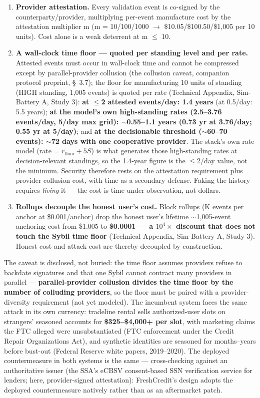 \documentclass[
]{article}
\begin{document}
\begin{enumerate}
\def\labelenumi{\arabic{enumi}.}
\item
  \textbf{Provider attestation.} Every validation event is co-signed by
  the counterparty/provider, multiplying per-event manufacture cost by
  the attestation multiplier m (m = 10/100/1000 \(\rightarrow\)
  \$10.05/\$100.50/\$1,005 per 10 units). Cost alone is a weak deterrent
  at m \(\leq\) 10.
\item
  \textbf{A wall-clock time floor --- quoted per standing level and per
  rate.} Attested events must occur in wall-clock time and cannot be
  compressed except by parallel-provider collusion (the collusion
  caveat, companion protocol preprint, §~3.7); the floor for
  manufacturing 10 units of standing (HIGH standing, 1,005 events) is
  quoted per rate (Technical Appendix, Sim-Battery A, Study 3):
  \textbf{at \(\leq\)2 attested events/day: 1.4 years} (at 0.5/day: 5.5
  years); \textbf{at the model's own high-standing rates (2.5--3.76
  events/day, 5/day max grid): \(\sim\)0.55--1.1 years (0.73 yr at
  3.76/day; 0.55 yr at 5/day)}; and \textbf{at the decisionable
  threshold (\(\sim\)60--70 events): \(\sim\)72 days with one
  cooperative provider}. The stack's own rate model (rate =
  \(r_{\mathrm{floor}} + 5S\)) is what generates those high-standing
  rates at decision-relevant standings, so the 1.4-year figure is the
  \(\leq\)2/day value, not the minimum. Security therefore rests on the
  attestation requirement plus provider collusion cost, with time as a
  secondary defense. Faking the history requires \emph{living} it ---
  the cost is time under observation, not dollars.
\item
  \textbf{Rollups decouple the honest user's cost.} Block rollups (K
  events per anchor at \$0.001/anchor) drop the honest user's lifetime
  \(\sim\)1,005-event anchoring cost from \$1.005 to \textbf{\$0.0001
  --- a \(10^{4}\times\) discount that does not touch the Sybil time
  floor} (Technical Appendix, Sim-Battery A, Study 3). Honest cost and
  attack cost are thereby decoupled by construction.
\end{enumerate}

The caveat is disclosed, not buried: the time floor assumes providers
refuse to backdate signatures and that one Sybil cannot contract many
providers in parallel --- \textbf{parallel-provider collusion divides
the time floor by the number of colluding providers}, so the floor must
be paired with a provider-diversity requirement (not yet modeled). The
incumbent system faces the same attack in its own currency: tradeline
rental sells authorized-user slots on strangers' seasoned accounts for
\textbf{\$325--\$4,000+ per slot}, with marketing claims the FTC alleged
were unsubstantiated (FTC enforcement under the Credit Repair
Organizations Act), and synthetic identities are seasoned for
months--years before bust-out (Federal Reserve white papers,
2019--2020). The deployed countermeasure in both systems is the same ---
cross-checking against an authoritative issuer (the SSA's eCBSV
consent-based SSN verification service for lenders; here,
provider-signed attestation): FreshCredit's design adopts the deployed
countermeasure natively rather than as an aftermarket patch.
\end{document}
